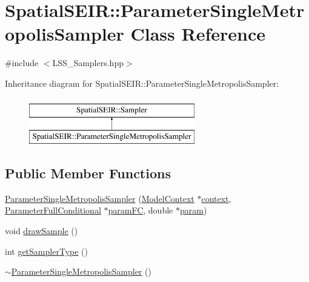 \hypertarget{classSpatialSEIR_1_1ParameterSingleMetropolisSampler}{\section{Spatial\-S\-E\-I\-R\-:\-:Parameter\-Single\-Metropolis\-Sampler Class Reference}
\label{classSpatialSEIR_1_1ParameterSingleMetropolisSampler}
}


{\ttfamily \#include $<$L\-S\-S\-\_\-\-Samplers.\-hpp$>$}

Inheritance diagram for Spatial\-S\-E\-I\-R\-:\-:Parameter\-Single\-Metropolis\-Sampler\-:\begin{figure}[H]
\begin{center}
\leavevmode
\includegraphics[height=2.000000cm]{classSpatialSEIR_1_1ParameterSingleMetropolisSampler}
\end{center}
\end{figure}
\subsection*{Public Member Functions}
\begin{DoxyCompactItemize}
\item 
\hyperlink{classSpatialSEIR_1_1ParameterSingleMetropolisSampler_a4918ba6b783bfabffa4fc42206a29ba3}{Parameter\-Single\-Metropolis\-Sampler} (\hyperlink{classSpatialSEIR_1_1ModelContext}{Model\-Context} $\ast$\hyperlink{classSpatialSEIR_1_1ParameterSingleMetropolisSampler_a4d66150fbe87614f62924200850ceb8d}{context}, \hyperlink{classSpatialSEIR_1_1ParameterFullConditional}{Parameter\-Full\-Conditional} $\ast$\hyperlink{classSpatialSEIR_1_1ParameterSingleMetropolisSampler_afa10a884a3c6772dfca224f058293dfd}{param\-F\-C}, double $\ast$\hyperlink{classSpatialSEIR_1_1ParameterSingleMetropolisSampler_a285f57aeb99f88605992bf25c9f38afb}{param})
\item 
void \hyperlink{classSpatialSEIR_1_1ParameterSingleMetropolisSampler_a637d48dfe689654490ab568e22e6037c}{draw\-Sample} ()
\item 
int \hyperlink{classSpatialSEIR_1_1ParameterSingleMetropolisSampler_a0576cfdda14e0afb0f63413f01a82c13}{get\-Sampler\-Type} ()
\item 
\hyperlink{classSpatialSEIR_1_1ParameterSingleMetropolisSampler_a3f55a283253add4cb4da09f2933275e3}{$\sim$\-Parameter\-Single\-Metropolis\-Sampler} ()
\end{DoxyCompactItemize}
